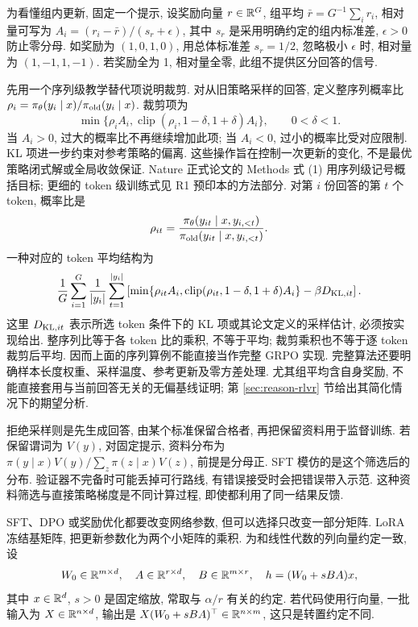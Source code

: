 为看懂组内更新, 固定一个提示, 设奖励向量 $r\in\mathbb R^G$, 组平均 $\bar r=G^{-1}\sum_i r_i$, 相对量可写为 $A_i=(r_i-\bar r)/(s_r+\epsilon)$, 其中 $s_r$ 是采用明确约定的组内标准差, $\epsilon>0$ 防止零分母. 如奖励为 $(1,0,1,0)$, 用总体标准差 $s_r=1/2$, 忽略极小 $\epsilon$ 时, 相对量为 $(1,-1,1,-1)$. 若奖励全为 1, 相对量全零, 此组不提供区分回答的信号.

先用一个序列级教学替代项说明裁剪. 对从旧策略采样的回答, 定义整序列概率比 $\rho_i=\pi_\theta(y_i\mid x)/\pi_{\rm old}(y_i\mid x)$. 裁剪项为
\[
\min\{\rho_iA_i,\operatorname{clip}(\rho_i,1-\delta,1+\delta)A_i\},\qquad0<\delta<1.
\]
当 $A_i>0$, 过大的概率比不再继续增加此项; 当 $A_i<0$, 过小的概率比受对应限制. KL 项进一步约束对参考策略的偏离. 这些操作旨在控制一次更新的变化, 不是最优策略闭式解或全局收敛保证. Nature 正式论文的 Methods 式 (1) 用序列级记号概括目标; 更细的 token 级训练式见 R1 预印本的方法部分\cite{r1nature,r1}. 对第 $i$ 份回答的第 $t$ 个 token, 概率比是
\[
 \rho_{it}=\frac{\pi_\theta(y_{it}\mid x,y_{i,<t})}
 {\pi_{\rm old}(y_{it}\mid x,y_{i,<t})}.
\]
一种对应的 token 平均结构为
\[
 \frac1G\sum_{i=1}^G\frac1{|y_i|}\sum_{t=1}^{|y_i|}
 \left[\min\{\rho_{it}A_i,
 \operatorname{clip}(\rho_{it},1-\delta,1+\delta)A_i\}
 -\beta D_{{\rm KL},it}\right].
\]
这里 $D_{{\rm KL},it}$ 表示所选 token 条件下的 KL 项或其论文定义的采样估计, 必须按实现给出. 整序列比等于各 token 比的乘积, 不等于平均; 裁剪乘积也不等于逐 token 裁剪后平均. 因而上面的序列算例不能直接当作完整 GRPO 实现. 完整算法还要明确样本长度权重、采样温度、参考更新及零方差处理. 尤其组平均含自身奖励, 不能直接套用与当前回答无关的无偏基线证明; 第 \ref{sec:reason-rlvr} 节给出其简化情况下的期望分析.

拒绝采样则是先生成回答, 由某个标准保留合格者, 再把保留资料用于监督训练. 若保留谓词为 $V(y)$, 对固定提示, 资料分布为 $\pi(y\mid x)V(y)/\sum_z\pi(z\mid x)V(z)$, 前提是分母正. SFT 模仿的是这个筛选后的分布. 验证器不完备时可能丢掉可行路线, 有错误接受时会把错误带入示范. 这种资料筛选与直接策略梯度是不同计算过程, 即使都利用了同一结果反馈.

\label{sec:lm-lora}
SFT、DPO 或奖励优化都要改变网络参数, 但可以选择只改变一部分矩阵. LoRA 冻结基矩阵, 把更新参数化为两个小矩阵的乘积\cite{lora}. 为和线性代数的列向量约定一致, 设
\[
W_0\in\mathbb R^{m\times d},\quad A\in\mathbb R^{r\times d},\quad B\in\mathbb R^{m\times r},\quad
h=(W_0+sBA)x,
\]
其中 $x\in\mathbb R^d$, $s>0$ 是固定缩放, 常取与 $\alpha/r$ 有关的约定. 若代码使用行向量, 一批输入为 $X\in\mathbb R^{n\times d}$, 输出是 $X(W_0+sBA)^\top\in\mathbb R^{n\times m}$, 这只是转置约定不同.

